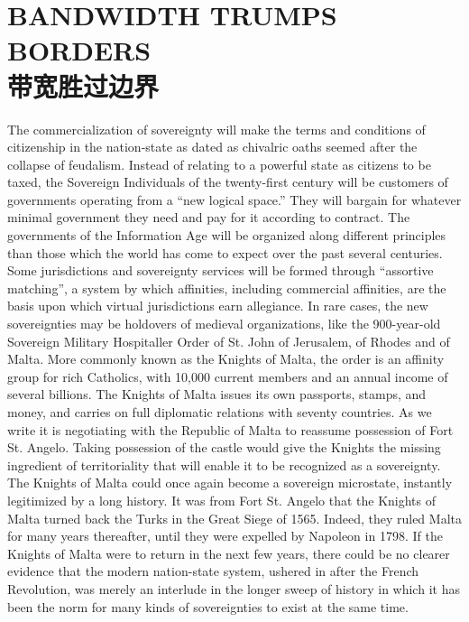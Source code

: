 \section[带宽胜过边界]{BANDWIDTH TRUMPS BORDERS\\带宽胜过边界}
\begin{paracol}{2}[]
	The commercialization of sovereignty will make the terms and conditions of citizenship in the nation-state as dated as chivalric oaths seemed after the collapse of feudalism. Instead of relating to a powerful state as citizens to be taxed, the Sovereign Individuals of the twenty-first century will be customers of governments operating from a “new logical space.” They will bargain for whatever minimal government they need and pay for it according to contract. The governments of the Information Age will be organized along different principles than those which the world has come to expect over the past several centuries. Some jurisdictions and sovereignty services will be formed through “assortive matching”, a system by which affinities, including commercial affinities, are the basis upon which virtual jurisdictions earn allegiance. In rare cases, the new sovereignties may be holdovers of medieval organizations, like the 900-year-old Sovereign Military Hospitaller Order of St. John of Jerusalem, of Rhodes and of Malta. More commonly known as the Knights of Malta, the order is an affinity group for rich Catholics, with 10,000 current members and an annual income of several billions. The Knights of Malta issues its own passports, stamps, and money, and carries on full diplomatic relations with seventy countries. As we write it is negotiating with the Republic of Malta to reassume possession of Fort St. Angelo. Taking possession of the castle would give the Knights the missing ingredient of territoriality that will enable it to be recognized as a sovereignty. The Knights of Malta could once again become a sovereign microstate, instantly legitimized by a long history. It was from Fort St. Angelo that the Knights of Malta turned back the Turks in the Great Siege of 1565. Indeed, they ruled Malta for many years thereafter, until they were expelled by Napoleon in 1798. If the Knights of Malta were to return in the next few years, there could be no clearer evidence that the modern nation-state system, ushered in after the French Revolution, was merely an interlude in the longer sweep of history in which it has been the norm for many kinds of sovereignties to exist at the same time.
	

\end{paracol}
